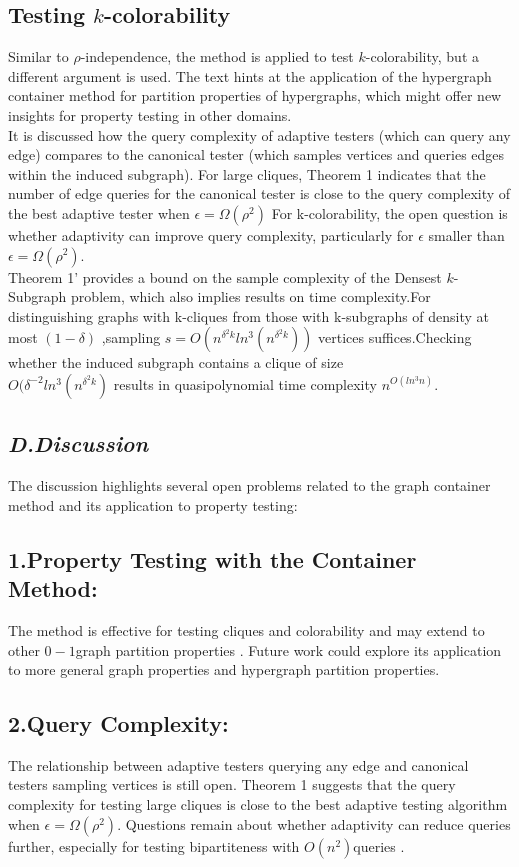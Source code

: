 \documentclass[preprint,11pt]{elsarticle}
\theoremstyle{definition}
\begin{document}
\begin{multicols}{2}
\subsection*{Testing $k$-colorability}
Similar to $\rho$-independence, the method is applied to test $k$-colorability, but a different argument is used.
The text hints at the application of the hypergraph container method for partition properties of hypergraphs, which might offer new insights for property testing in other domains.\\
It is discussed how the query complexity of adaptive testers (which can query any edge) compares to the canonical tester (which samples vertices and queries edges within the induced subgraph).
For large cliques, Theorem 1 indicates that the number of edge queries for the canonical tester is close to the query complexity of the best adaptive tester when 
$\epsilon=\Omega(\rho^2)$
For k-colorability, the open question is whether adaptivity can improve query complexity, particularly for $\epsilon$ smaller than $\epsilon=\Omega(\rho^2)$.\\
Theorem 1' provides a bound on the sample complexity of the Densest $k$-Subgraph problem, which also implies results on time complexity.For distinguishing graphs with k-cliques from those with k-subgraphs of density at most $(1-\delta)$ ,sampling $s=O(n^{\delta^2k}ln^3(n^{\delta^2k}))$ vertices suffices.Checking whether the induced subgraph contains a clique of size \\$O(\delta^{-2}ln^3(n^{\delta^2k})$ results in quasipolynomial time complexity $n^{O(ln^3n)}$.
\subsection*{\textit{\textbf{D.Discussion}}}
The discussion highlights several open problems related to the graph container method and its application to property testing:
\subsection*{ 1.Property Testing with the Container Method:}
The method is effective for testing cliques and colorability and may extend to other $0-1$graph partition properties \cite{NR18}. Future work could explore its application to more general graph properties and hypergraph partition properties.
\subsection*{2.Query Complexity:}The relationship between adaptive testers querying any edge and canonical testers sampling vertices is still open. Theorem 1 suggests that the query complexity for testing large cliques is close to the best adaptive testing algorithm when 
$\epsilon=\Omega(\rho^2)$. Questions remain about whether adaptivity can reduce queries further, especially for testing bipartiteness with 
$O(n^2)$queries \cite{BL10}.

\end{multicols}
\end{document}
